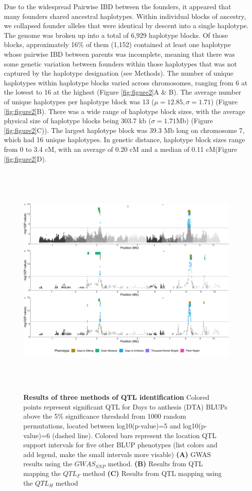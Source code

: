 \documentclass[article,9pt,twocolumn,twoside]{rilabRxiv}
\begin{document}
Due to the widespread Pairwise IBD between the founders, it appeared that many founders shared ancestral haplotypes.
Within individual blocks of ancestry, we collapsed founder alleles that were identical by descent into a single haplotype.
The genome was broken up into a total of 6,929 haplotype blocks.
Of those blocks, approximately 16\% of them (1,152) contained at least one haplotype whose pairwise IBD between parents was incomplete, meaning that there was some genetic variation between founders within those haplotypes that was not captured by the haplotype designation (see Methods).
The number of unique haplotypes within haplotype blocks varied across chromosomes, ranging from 6 at the lowest to 16 at the highest (Figure  \ref{fig:figure2}A \& B).
The average number of unique haplotypes per haplotype block was 13 ($\mu = 12.85, \sigma =1.71$) (Figure \ref{fig:figure2}B).
There was a wide range of haplotype block sizes, with the average physical size of haplotype blocks being 303.7 kb ($\sigma =1.71$Mb) (Figure \ref{fig:figure2}C)).
The largest haplotype block was 39.3 Mb long on chromosome 7, which had 16 unique haplotypes.
In genetic distance, haplotype block sizes range from 0 to 3.4 cM, with an average of 0.20 cM and a median of 0.11 cM(Figure \ref{fig:figure2}D).

\begin{figure}[h!t]
\centering
\includegraphics[width=\textwidth,height=12cm]{figures/Methods_Fig3_alltraits.png}
\caption{\textbf{Results of three methods of QTL identification} Colored points represent significant QTL for Days to anthesis (DTA) BLUPs above the 5\% significance threshold from 1000 random permutations, located between log10(p-value)=5 and log10(p-value)=6 (dashed line). Colored bars represent the location QTL support intervals for five other BLUP phenotypes (list colors and add legend, make the small intervals more visable) \textbf{(A)} GWAS results using the $GWAS_{SNP}$ method. \textbf{(B)} Results from QTL mapping the $QTL_F$ method \textbf{(C)} Results from QTL mapping using the $QTL_H$ method}
\label{fig:figure3}
\end{figure}
\end{document}

